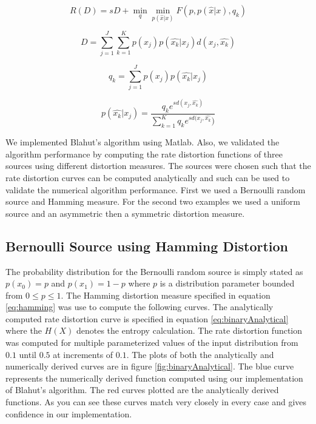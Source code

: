 \documentclass[journal]{IEEEtran}
\begin{document}
\begin{equation}
\label{eq:newR_D}
R(D) = sD + \min_{q}\min_{p(\hat{x}|x)}F(p, p(\hat{x}|x),q_k)
\end{equation}

\begin{equation}
\label{eq:newD}
D = \sum_{j=1}^{J}\sum_{k=1}^{K}p(x_j)p(\hat{x_k}|x_j)d(x_j,\hat{x_k})
\end{equation}

\begin{equation}
\label{eq:q_k}
q_k = \sum_{j=1}^{J}p(x_j)p(\hat{x_k}|x_j)
\end{equation}

\begin{equation}
\label{eq:newp}
p(\hat{x_k}|x_j) = \frac{q_ke^{sd(x_j,\hat{x_k})}}{\sum_{k=1}^{K}q_ke^{sd(x_j,\hat{x_k}})}
\end{equation}

\par We implemented Blahut's algorithm using Matlab. Also, we validated the algorithm performance by computing the rate distortion functions of three sources using different distortion measures. The sources were chosen such that the rate distortion curves can be computed analytically and such can be used to validate the numerical algorithm performance. First we used a Bernoulli random source and Hamming measure. For the second two examples we used a uniform source and an asymmetric then a symmetric distortion measure.

\subsection{Bernoulli Source using Hamming Distortion}
\par The probability distribution for the Bernoulli random source is simply stated as \(p(x_0) = p\) and \(p(x_1) = 1-p\) where \(p\) is a distribution parameter bounded from \(0\leq p \leq1\). The Hamming distortion measure specified in equation \ref{eq:hamming} was use to compute the following curves. The analytically computed rate distortion curve is specified in equation \ref{eq:binaryAnalytical} where the \(H(X)\) denotes the entropy calculation. The rate distortion function was computed for multiple parameterized values of the input distribution from \(0.1\) until \(0.5\) at increments of \(0.1\). The plots of both the analytically and numerically derived curves are in figure \ref{fig:binaryAnalytical}. The blue curve represents the numerically derived function computed using our implementation of Blahut's algorithm. The red curves plotted are the analytically derived functions. As you can see these curves match very closely in every case and gives confidence in our implementation.
\end{document}
